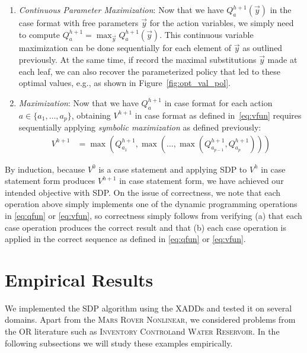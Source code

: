 \documentclass[letterpaper]{article}
\newcommand{\MarsRoverNL}{\textsc{Mars Rover Nonlinear}}
\newcommand{\InventoryControl}{\textsc{Inventory Control}}
\newcommand{\WaterReservoir}{\textsc{Water Reservoir}}
\begin{document}
\begin{enumerate}
\item {\it Continuous Parameter Maximization}: Now that we have
$Q_a^{h+1}(\vec{y})$ in the case format with free parameters $\vec{y}$
for the action variables, we simply need to compute $Q_a^{h+1} =
\max_{\vec{y}} Q_a^{h+1}(\vec{y})$.  This continuous variable
maximization can be done sequentially for each element of $\vec{y}$ as
outlined previously.  At the same time, if record the maximal
substitutions $\vec{y}$ made at each leaf, we can also recover
the parameterized policy that led to these optimal values, e.g.,
as shown in Figure~\ref{fig:opt_val_pol}.

\item {\it Maximization}: Now that we have $Q_a^{h+1}$ in
case format for each action $a \in \{a_1,\ldots,a_p\}$, obtaining
$V^{h+1}$ in case format as defined in~\eqref{eq:vfun} requires
sequentially applying
\emph{symbolic maximization} as defined previously:
\begin{align*}
V^{h+1} & = 
\max(Q_{a_1}^{h+1},\max(\ldots,\max(Q_{a_{p-1}}^{h+1},Q_{a_p}^{h+1})))
\end{align*}
\end{enumerate}
By induction, because $V^0$ is a case statement and applying
SDP to $V^h$ in case statement form produces $V^{h+1}$ in case
statement form, we have achieved our intended
objective with SDP.  On the issue of correctness,
we note that each operation above simply implements one of the
dynamic programming operations in \eqref{eq:qfun} or \eqref{eq:vfun}, 
so correctness simply follows from verifying (a) that each case
operation produces the correct result and that (b) each case operation
is applied in the correct sequence as defined in \eqref{eq:qfun} or 
\eqref{eq:vfun}.  

\section{Empirical Results}
 
We implemented the SDP algorithm using the XADDs and tested it on several
domains. Apart from the \MarsRoverNL, we considered problems from the OR
literature such as \InventoryControl and \WaterReservoir. In the following
subsections we will study these examples empirically.
 
\end{document}
